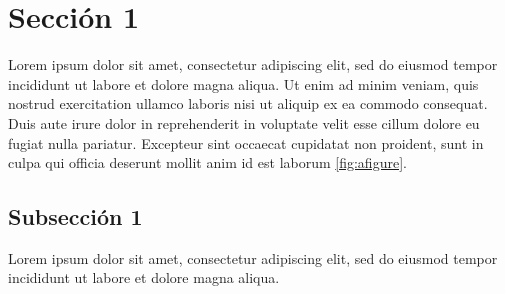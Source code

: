 \section{Sección 1}
Lorem ipsum dolor sit amet, consectetur adipiscing elit, sed do eiusmod tempor incididunt ut labore et dolore magna aliqua. Ut enim ad minim veniam, quis nostrud exercitation ullamco laboris nisi ut aliquip ex ea commodo consequat. Duis aute irure dolor in reprehenderit in voluptate velit esse cillum dolore eu fugiat nulla pariatur. Excepteur sint occaecat cupidatat non proident, sunt in culpa qui officia deserunt mollit anim id est laborum \ref{fig:afigure}.

\subsection{Subsección 1}
Lorem ipsum dolor sit amet, consectetur adipiscing elit, sed do eiusmod tempor incididunt ut labore et dolore magna aliqua.
